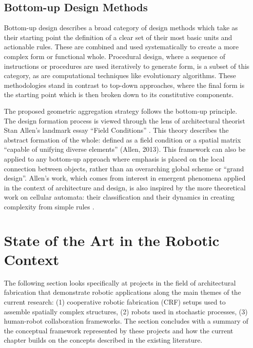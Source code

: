     \subsection{Bottom-up Design Methods}
        Bottom-up design describes a broad category of design methods which take as their starting point the definition of a clear set of their most basic units and actionable rules. These are combined and used systematically to create a more complex form or functional whole. Procedural design, where a sequence of instructions or procedures are used iteratively to generate form, is a subset of this category, as are computational techniques like evolutionary algorithms. These methodologies stand in contrast to top-down approaches, where the final form is the starting point which is then broken down to its constitutive components.
        
        The proposed geometric aggregation strategy follows the bottom-up principle. The design formation process is viewed through the lens of architectural theorist Stan Allen's landmark essay “Field Conditions” \citep{allen_field_2010,allen_field_2013}. This theory describes the abstract formation of the whole: defined as a field condition or a spatial matrix “capable of unifying diverse elements” (Allen, 2013). This framework can also be applied to any bottom-up approach where emphasis is placed on the local connection between objects, rather than an overarching global scheme or “grand design”. Allen's work, which comes from interest in emergent phenomena applied in the context of architecture and design, is also inspired by the more theoretical work on cellular automata: their classification \citep{wolfram_new_2002} and their dynamics in creating complexity from simple rules \citep{langton_life_1992}. 
    
        
\section{State of the Art in the Robotic Context}
    
    The following section looks specifically at projects in the field of architectural fabrication that demonstrate robotic applications along the main themes of the current research: (1) cooperative robotic fabrication (CRF) setups used to assemble spatially complex structures, (2) robots used in stochastic processes, (3) human-robot collaboration frameworks. The section concludes with a summary of the conceptual framework represented by these projects and how the current chapter builds on the concepts described in the existing literature.
    
